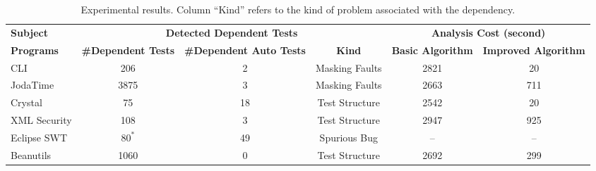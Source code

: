 \newcommand{\masking}{Masking Faults}
\newcommand{\initializaiton}{Test Structure} %
\newcommand{\spurious}{Spurious Bug}

\begin{table*}
\centering
\setlength{\tabcolsep}{0.3\tabcolsep}
\begin{tabular}{|l||c|c|c||c|c|}
\hline
\textbf{Subject} & \multicolumn{3}{|c||}{\textbf{Detected Dependent Tests}} & \multicolumn{2}{|c|}{\textbf{Analysis Cost (second)}}\\
\cline{2-6}
\textbf{Programs} & \textbf{\#Dependent Tests} & \textbf{\#Dependent Auto Tests} &
\textbf{Kind} &
\textbf{Basic Algorithm} & \textbf{Improved Algorithm}
\\
\hline
CLI & 206 
& 2 & \masking{}& 2821& 20  \\
JodaTime & 3875 
& 3 & \masking{} & 2663 & 711  \\
Crystal & 75 & 18 &\initializaiton{} & 2542 & 20 \\
XML Security & 108 & 3 & \initializaiton{}& 2947 & 925  \\ %
Eclipse SWT & $80^*$ 
& 49 & \spurious{} & -- & -- 
\\
Beanutils & 1060 & 0 & \initializaiton{} & 2692 & 299 \\
\hline
\end{tabular}
\caption{Experimental results. Column ``Kind'' refers to the kind
of problem associated with the dependency. 
}
\label{tab:results}
\end{table*}
